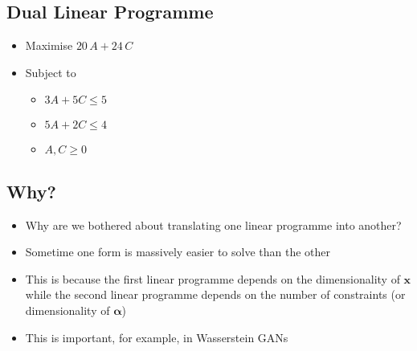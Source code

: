 
\begin{slide}
\section{Dual Linear Programme}

\pb
\begin{minipage}{0.4\linewidth}
    \begin{itemize}
    \item Maximise $20\,A + 24\,C$
    \item Subject to
      \begin{itemize}
      \item $3 A + 5 C \leq 5$
      \item $5 A + 2 C \leq 4$
      \item $A, C \geq 0$\pause
      \end{itemize}
    \end{itemize}
\end{minipage}\hfill
\begin{minipage}{0.55\linewidth}
  \pause
\end{minipage}
\end{slide}


\begin{slide}
\section{Why?}

\begin{PauseHighLight}
  \begin{itemize}
  \item Why are we bothered about translating one linear programme
    into another?\pause
  \item Sometime one form is massively easier to solve than the
    other\pause
  \item This is because the first linear programme depends on the
    dimensionality of $\bm{x}$ while the second linear programme
    depends on the number of constraints (or dimensionality of
    $\bm{\alpha}$)\pause
  \item This is important, for example, in Wasserstein GANs\pause
  \end{itemize}
\end{PauseHighLight}

\end{slide}



